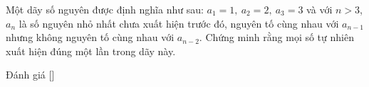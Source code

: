 \ifshowproblem
\begin{problem}\label{problem:RUS-2015-SMO-10-P6}
    Một dãy số nguyên được định nghĩa như sau: \( a_1 = 1,\ a_2 = 2,\ a_3 = 3 \) và với \( n > 3 \),
    $a_n$ là số nguyên nhỏ nhất chưa xuất hiện trước đó, nguyên tố cùng nhau với $a_{n-1}$ nhưng không nguyên tố cùng nhau với $a_{n-2}$.
    Chứng minh rằng mọi số tự nhiên xuất hiện đúng một lần trong dãy này.
\end{problem}
\fi

\ifshowinfo
Đánh giá [\textbf{}]\footnotemark
{}
\fi